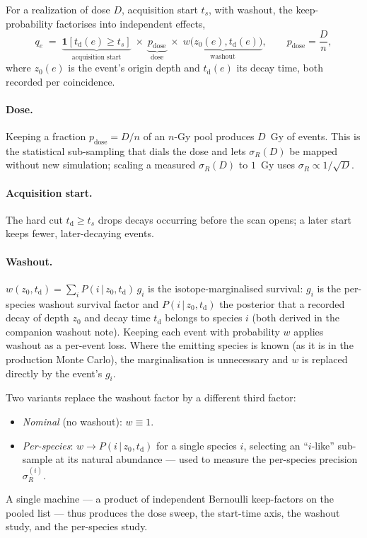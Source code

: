 \documentclass[11pt]{article}
\begin{document}
For a realization of dose $D$, acquisition start $t_s$, with washout, the
keep-probability factorises into independent effects,
%
\begin{equation}
  q_e \;=\; \underbrace{\mathbf{1}\!\left[t_{\mathrm{d}}(e)\ge t_s\right]}
              _{\text{acquisition start}}
        \;\times\; \underbrace{p_{\mathrm{dose}}}_{\text{dose}}
        \;\times\; \underbrace{w\bigl(z_0(e),t_{\mathrm{d}}(e)\bigr)}
              _{\text{washout}},
  \qquad
  p_{\mathrm{dose}} = \frac{D}{n},
  \label{eq:keep}
\end{equation}
%
where $z_0(e)$ is the event's origin depth and $t_{\mathrm{d}}(e)$ its decay
time, both recorded per coincidence.

\paragraph{Dose.}
Keeping a fraction $p_{\mathrm{dose}}=D/n$ of an $n$-Gy pool produces $D$~Gy of
events. This is the statistical sub-sampling that dials the dose and lets
$\sigma_R(D)$ be mapped without new simulation; scaling a measured $\sigma_R(D)$
to $1$~Gy uses $\sigma_R\propto 1/\sqrt{D}$.

\paragraph{Acquisition start.}
The hard cut $t_{\mathrm{d}}\ge t_s$ drops decays occurring before the scan opens;
a later start keeps fewer, later-decaying events.

\paragraph{Washout.}
$w(z_0,t_{\mathrm{d}})=\sum_i P(i\,|\,z_0,t_{\mathrm{d}})\,g_i$ is the
isotope-marginalised survival: $g_i$ is the per-species washout survival factor
and $P(i\,|\,z_0,t_{\mathrm{d}})$ the posterior that a recorded decay of depth
$z_0$ and decay time $t_{\mathrm{d}}$ belongs to species $i$ (both derived in the
companion washout note). Keeping each event with probability $w$ applies washout
as a per-event loss. Where the emitting species is known (as it is in the
production Monte Carlo), the marginalisation is unnecessary and $w$ is replaced
directly by the event's $g_i$.

Two variants replace the washout factor by a different third factor:
%
\begin{itemize}
  \item \emph{Nominal} (no washout): $w\equiv 1$.
  \item \emph{Per-species}: $w \to P(i\,|\,z_0,t_{\mathrm{d}})$ for a single
        species $i$, selecting an ``$i$-like'' sub-sample at its natural
        abundance --- used to measure the per-species precision
        $\sigma_R^{(i)}$.
\end{itemize}
%
A single machine --- a product of independent Bernoulli keep-factors on the
pooled list --- thus produces the dose sweep, the start-time axis, the washout
study, and the per-species study.
\end{document}

